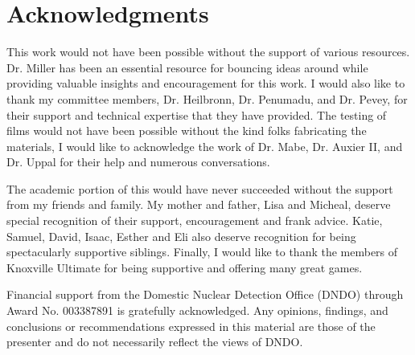 \chapter*{Acknowledgments}

This work would not have been possible without the support of various resources.
Dr. Miller has been an essential resource for bouncing ideas around while providing valuable insights and encouragement for this work.
I would also like to thank my committee members, Dr. Heilbronn, Dr. Penumadu, and Dr. Pevey, for their support and technical expertise that they have provided. 
The testing of films would not have been possible without the kind folks fabricating the materials, I would like to acknowledge the work of Dr. Mabe, Dr. Auxier II, and Dr. Uppal for their help and numerous conversations.

The academic portion of this would have never succeeded without the support from my friends and family. 
My mother and father, Lisa and Micheal, deserve special recognition of their support, encouragement and frank advice. 
Katie, Samuel, David, Isaac, Esther and Eli also deserve recognition for being spectacularly supportive siblings. 
Finally, I would like to thank the members of Knoxville Ultimate for being supportive and offering many great games.

Financial support from the Domestic Nuclear Detection Office (DNDO) through Award No. 003387891 is gratefully acknowledged. 
 Any opinions, findings, and conclusions or recommendations expressed in this material are those of the presenter and do not necessarily reflect the views of DNDO.
